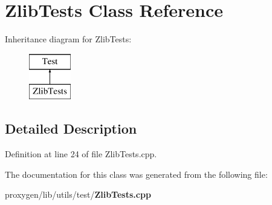\section{Zlib\+Tests Class Reference}
\label{classZlibTests}
Inheritance diagram for Zlib\+Tests\+:\begin{figure}[H]
\begin{center}
\leavevmode
\includegraphics[height=2.000000cm]{classZlibTests}
\end{center}
\end{figure}


\subsection{Detailed Description}


Definition at line 24 of file Zlib\+Tests.\+cpp.



The documentation for this class was generated from the following file\+:\begin{DoxyCompactItemize}
\item 
proxygen/lib/utils/test/{\bf Zlib\+Tests.\+cpp}\end{DoxyCompactItemize}
